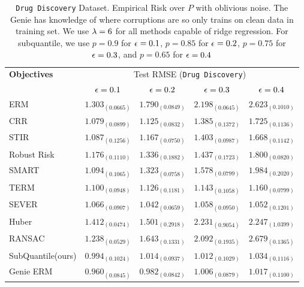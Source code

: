 \documentclass{article} %
\newcommand{\subhead}[1]{\multicolumn{1}{c}{#1}}%
\begin{document}
	\begin{table}[!h]
		\centering
		\begin{tabular}{lcccc}
			\toprule 
			\textbf{Objectives}&\multicolumn{4}{c}{Test RMSE (\texttt{Drug Discovery})}\\                   
			\cmidrule(rl){2-5}
			&\subhead{${\epsilon} = 0.1$}& \subhead{${\epsilon} = 0.2$}& \subhead{${\epsilon} = 0.3$}& \subhead{${\epsilon} = 0.4$}\\ 
			\midrule
			ERM  &$1.303_{(0.0665)}$&$1.790_{(0.0849)}$&$2.198_{(0.0645)}$&$2.623_{(0.1010)}$\\
			CRR \cite{bhatia2017}  &$1.079_{(0.0899)}$&$1.125_{(0.0832)}$&$1.385_{(0.1372)}$&$1.725_{(0.1136)}$\\
			STIR \cite{pmlr-v89-mukhoty19a} &$1.087_{(0.1256)}$&$1.167_{(0.0750)}$&$1.403_{(0.0987)}$&$1.668_{(0.1142)}$\\
			Robust Risk \cite{RRM} &$1.176_{(0.1110)}
			$&$1.336_{(0.1882)}$&$1.437_{(0.1723)}$&$1.800_{(0.0820)}$\\
			SMART \cite{https://doi.org/10.48550/arxiv.2206.04777} &$1.094_{(0.1065)}$&$1.323_{(0.0758)}$&$1.578_{(0.0799)}$&$1.984_{(0.2020)}$\\
			TERM \cite{li2020tilted} &$1.100_{(0.0948)}$&$1.126_{(0.1181)}$&$1.143_{(0.1058)}$&$1.160_{(0.0799)}$\\
			SEVER \cite{DiakonikolasKKLSS19} &$\mathbf{1.066_{(0.0907)}}$&$\mathbf{1.042_{(0.0659)}}$&$\mathbf{1.058_{(0.0950)}}$&$\mathbf{1.052_{(0.1201)}}$\\
			Huber \cite{Huber2009} &$1.412_{(0.0474)}$&$1.501_{(0.2918)}$&$2.231_{(0.9054)}$&$2.247_{(1.0399)}$\\
			RANSAC \cite{RANSAC1981} &$1.238_{(0.0529)}$&$1.643_{(0.1331)}$&$2.092_{(0.1935)}$&$2.679_{(0.1365)}$\\
			\rowcolor{LightCyan}
			SubQuantile(ours) &$\mathbf{0.994_{(0.1024)}}$&$\mathbf{1.014_{(0.0937)}}$&$\mathbf{1.012_{(0.1029)}}$&$\mathbf{1.034_{(0.1116)}}$\\
			\midrule 
			Genie ERM &$0.960_{(0.0845)}$&$0.982_{(0.0842)}$&$1.006_{(0.0879)}$&$1.017_{(0.1100)}$\\
			\bottomrule
		\end{tabular}
		\caption{\texttt{Drug Discovery} Dataset. Empirical Risk over $P$ with oblivious noise. The Genie has knowledge of where corruptions are so only trains on clean data in training set. We use $\lambda = 6$ for all methods capable of ridge regression. For subquantile, we use $p = 0.9$ for ${\epsilon} = 0.1$, $p=0.85$ for ${\epsilon}=0.2$, $p = 0.75$ for ${\epsilon} = 0.3$, and $p = 0.65$ for ${\epsilon} = 0.4$}
		\label{tab:drug-discovery}
	\end{table}
	
\end{document}
